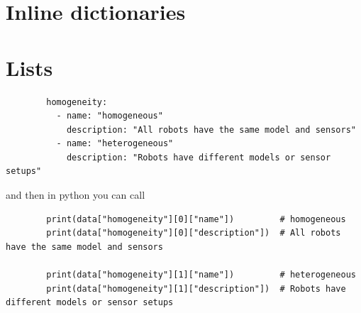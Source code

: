 \section{Inline dictionaries}

\section{Lists}
    \begin{verbatim}
        homogeneity:
          - name: "homogeneous"
            description: "All robots have the same model and sensors"
          - name: "heterogeneous"
            description: "Robots have different models or sensor setups"
    \end{verbatim}
    and then in python you can call
    \begin{verbatim}
        print(data["homogeneity"][0]["name"])         # homogeneous
        print(data["homogeneity"][0]["description"])  # All robots have the same model and sensors
        
        print(data["homogeneity"][1]["name"])         # heterogeneous
        print(data["homogeneity"][1]["description"])  # Robots have different models or sensor setups
    \end{verbatim}
    
    \begin{verbatim}
    
    \end{verbatim}